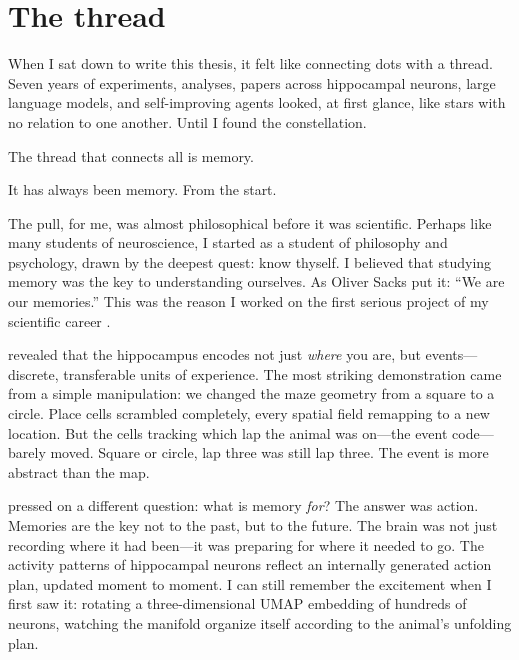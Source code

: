 

\section{The thread}

When I sat down to write this thesis, it felt like connecting dots with a thread.
Seven years of experiments, analyses, papers across hippocampal neurons, large language models,
and self-improving agents looked, at first glance, like stars with no relation to one another.
Until I found the constellation.

The thread that connects all is memory.

It has always been memory. From the start.

The pull, for me, was almost philosophical before it was scientific. Perhaps like many students
of neuroscience, I started as a student of philosophy and psychology, drawn by the deepest quest:
know thyself. I believed that studying memory was the key to understanding ourselves. As Oliver
Sacks put it: ``We are our memories.'' This was the reason I worked on the first serious project of my scientific career
\citep{sun2020}.

\citet{sun2020} revealed that the hippocampus encodes not just \textit{where} you are, but
events---discrete, transferable units of experience. The most striking demonstration came from a
simple manipulation: we changed the maze geometry from a square to a circle. Place cells scrambled
completely, every spatial field remapping to a new location. But the cells tracking which lap the
animal was on---the event code---barely moved. Square or circle, lap three was still lap three.
The event is more abstract than the map.

\citet{zutshi2025} pressed on a different question: what is memory \textit{for}? The answer was
action. Memories are the key not to the past, but to the future. The brain was not just recording
where it had been---it was preparing for where it needed to go. The activity patterns of
hippocampal neurons reflect an internally generated action plan, updated moment to moment. I can
still remember the excitement when I first saw it: rotating a three-dimensional UMAP embedding of
hundreds of neurons, watching the manifold organize itself according to the animal's unfolding
plan.

